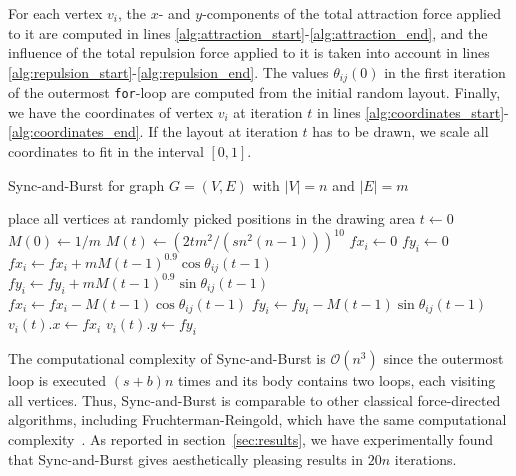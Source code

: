 \documentclass{llncs}
\begin{document}
For each vertex $v_i$, the $x$- and $y$-components of the total attraction force applied to it are computed in lines \ref{alg:attraction_start}-\ref{alg:attraction_end}, and the influence of the total repulsion force applied to it is taken into account in lines \ref{alg:repulsion_start}-\ref{alg:repulsion_end}. The values $\theta_{ij}(0)$ in the first iteration of the outermost \texttt{for}-loop are computed from the initial random layout. Finally, we have the coordinates of vertex $v_i$ at iteration $t$ in lines \ref{alg:coordinates_start}-\ref{alg:coordinates_end}. If the layout at iteration $t$ has to be drawn, we scale all coordinates to fit in the interval $[0, 1]$.

\begin{algorithm}
\caption{Sync-and-Burst for graph $G=(V, E)$ with $|V|=n$ and $|E|=m$}
\begin{algorithmic}[1]
\STATE place all vertices at randomly picked positions in the drawing area
\STATE $t \leftarrow 0$
\STATE $M(0) \leftarrow 1/m$
     \STATE $M(t) \leftarrow (2tm^2/(sn^2(n-1)))^{10}$ \label{alg:iteration_start}
          \STATE $fx_{i} \leftarrow 0$
          \STATE $fy_{i} \leftarrow 0$
                \label{alg:attraction_start}
                    \STATE $fx_{i} \leftarrow fx_{i} + mM(t-1)^{0.9} \cos{\theta_{ij}(t-1)}$
                    \STATE $fy_{i} \leftarrow fy_{i} + mM(t-1)^{0.9} \sin{\theta_{ij}(t-1)}$ 
               \ENDIF \label{alg:attraction_end}
                \label{alg:repulsion_start}
                    \STATE $fx_{i} \leftarrow fx_{i} -  M(t-1) \cos{\theta_{ij}(t-1)}$
                    \STATE $fy_{i} \leftarrow fy_{i} -  M(t-1) \sin{\theta_{ij}(t-1)}$ 
               \ENDIF \label{alg:repulsion_end}
           \ENDFOR
           \STATE $v_i(t).x \leftarrow fx_{i}$ \label{alg:coordinates_start}
           \STATE $v_i(t).y \leftarrow fy_{i}$ \label{alg:coordinates_end} \label{alg:iteration_end}
     \ENDFOR
\ENDFOR
\end{algorithmic}
\label{alg:sync-and-burst}
\end{algorithm}

The computational complexity of Sync-and-Burst is $\mathcal{O}(n^3)$ since the outermost loop is executed $(s+b)n$ times and its body contains two loops, each visiting all vertices. Thus, Sync-and-Burst is comparable to other classical force-directed algorithms, including Fruchterman-Reingold, which have the same computational complexity~\cite{Kobourov2013}. As reported in section~\ref{sec:results}, we have experimentally found that Sync-and-Burst gives aesthetically pleasing results in $20n$ iterations.
\end{document}
